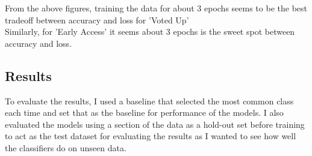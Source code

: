 \documentclass[11pt]{article} %
\begin{document}
\begin{figure}[h]
\centering
{}
\qquad
{}
\end{figure}
From the above figures,  training the data for about 3 epochs seems to be the best tradeoff between accuracy and loss for 'Voted Up'
\\ Similarly,  for 'Early Access' it seems about 3 epochs is the sweet spot between accuracy and loss.
\subsection{Results}
To evaluate the results,  I used a baseline that selected the most common class each time and set that as the baseline for performance of the models. I also evaluated the models using a section of the data as a hold-out set before training to act as the test dataset for evaluating the results as I wanted to see how well the classifiers do on unseen data.
\end{document}
